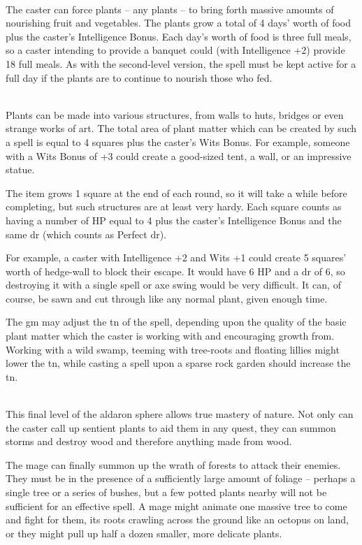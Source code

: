 \documentclass[titlepage,a4paper,openany]{book}
\begin{document}
\begin{multicols}{2}
\\
The caster can force plants -- any plants -- to bring forth massive amounts of nourishing fruit and vegetables. The plants grow a total of 4 days' worth of food plus the caster's Intelligence Bonus. Each day's worth of food is three full meals, so a caster intending to provide a banquet could (with Intelligence +2) provide 18 full meals. As with the second-level version, the spell must be kept active for a full day if the plants are to continue to nourish those who fed.

\\
Plants can be made into various structures, from walls to huts, bridges or even strange works of art. The total area of plant matter which can be created by such a spell is equal to 4 squares plus the caster's Wits Bonus. For example, someone with a Wits Bonus of +3 could create a good-sized tent, a wall, or an impressive statue.

The item grows 1 square at the end of each \gls{round}, so it will take a while before completing, but such structures are at least very hardy. Each square counts as having a number of HP equal to 4 plus the caster's Intelligence Bonus and the same \gls{dr} (which counts as Perfect \gls{dr}).

For example, a caster with Intelligence +2 and Wits +1 could create 5 squares' worth of hedge-wall to block their escape. It would have 6 HP and a \gls{dr} of 6, so destroying it with a single spell or axe swing would be very difficult. It can, of course, be sawn and cut through like any normal plant, given enough time.

The \gls{gm} may adjust the \gls{tn} of the spell, depending upon the quality of the basic plant matter which the caster is working with and encouraging growth from. Working with a wild swamp, teeming with tree-roots and floating lillies might lower the \gls{tn}, while casting a spell upon a sparse rock garden should increase the \gls{tn}.

\spelllevel

\\
This final level of the aldaron sphere allows true mastery of nature. Not only can the caster call up sentient plants to aid them in any quest, they can summon storms and destroy wood and therefore anything made from wood.

The mage can finally summon up the wrath of forests to attack their enemies. They must be in the presence of a sufficiently large amount of foliage -- perhaps a single tree or a series of bushes, but a few potted plants nearby will not be sufficient for an effective spell. A mage might animate one massive tree to come and fight for them, its roots crawling across the ground like an octopus on land, or they might pull up half a dozen smaller, more delicate plants.


\end{multicols}
\end{document}
